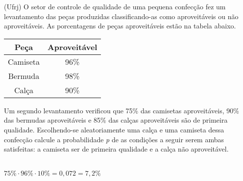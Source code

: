 \begin{ex}
(Ufrj) O setor de controle de qualidade de uma pequena confecção fez um levantamento das peças produzidas classificando-as como aproveitáveis ou não aproveitáveis. As porcentagens de peças aproveitáveis estão na tabela abaixo.
\begin{center}
\begin{tabular}{|c|c|}  \hline
\textbf{Peça}  & \textbf{Aproveitável}  \\  \hline
Camiseta  &  96\%  \\ \hline
Bermuda   &  98\%  \\  \hline
Calça     &  90\%   \\  \hline
\end{tabular}
\end{center}
Um segundo levantamento verificou que 75\% das camisetas aproveitáveis, 90\% das bermudas aproveitáveis e 85\% das calças aproveitáveis são de primeira qualidade.	Escolhendo-se aleatoriamente uma calça e uma camiseta dessa confecção calcule a probabilidade \textit{p} de as condições a seguir serem ambas satisfeitas: a camiseta ser de primeira qualidade e a calça não aproveitável.
 \begin{sol}
  \phantom{A} \\
   $75\%\cdot96\%\cdot10\%= 0,072=7,2\%$
 \end{sol}
\end{ex}